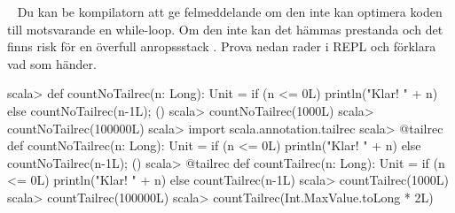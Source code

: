 
\QUESTBEGIN

\Task  \what~  Du kan be kompilatorn att ge felmeddelande om den inte kan optimera koden till motsvarande en while-loop. Om den inte kan det hämmas prestanda och det finns risk för en överfull anropssstack . Prova nedan rader i REPL och förklara vad som händer.
\begin{REPL}
scala> def countNoTailrec(n: Long): Unit =
         if (n <= 0L) println("Klar! " + n) else {countNoTailrec(n-1L); ()}
scala> countNoTailrec(1000L)
scala> countNoTailrec(100000L)
scala> import scala.annotation.tailrec
scala> @tailrec def countNoTailrec(n: Long): Unit =
         if (n <= 0L) println("Klar! " + n) else {countNoTailrec(n-1L); ()}
scala> @tailrec def countTailrec(n: Long): Unit =
         if (n <= 0L) println("Klar! " + n) else countTailrec(n-1L)
scala> countTailrec(1000L)
scala> countTailrec(100000L)
scala> countTailrec(Int.MaxValue.toLong * 2L)
\end{REPL}\SOLUTION


\QUESTEND
